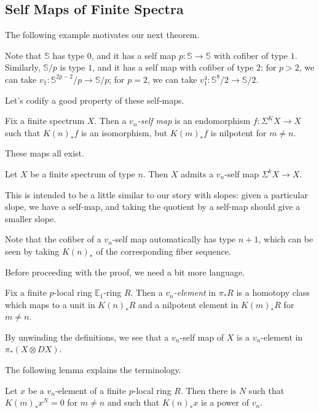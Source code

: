 \documentclass[../notes.tex]{subfiles}
\begin{document}
\subsection{Self Maps of Finite Spectra}
The following example motivates our next theorem.
\begin{example}
	Note that $\mathbb S$ has type $0$, and it has a self map $p\colon\mathbb S\to\mathbb S$ with cofiber of type $1$. Similarly, $\mathbb S/p$ is type $1$, and it has a self map with cofiber of type $2$: for $p>2$, we can take $v_1\colon\mathbb S^{2p-2}/p\to\mathbb S/p$; for $p=2$, we can take $v_1^4\colon\mathbb S^8/2\to\mathbb S/2$.
\end{example}
Let's codify a good property of these self-maps.
\begin{definition}
	Fix a finite spectrum $X$. Then a \textit{$v_n$-self map} is an endomorphism $f\colon\Sigma^KX\to X$ such that $K(n)_*f$ is an isomorphism, but $K(m)_*f$ is nilpotent for $m\ne n$.
\end{definition}
These maps all exist.
\begin{theorem} \label{thm:vn-maps-exist}
	Let $X$ be a finite spectrum of type $n$. Then $X$ admits a $v_n$-self map $\Sigma^kX\to X$.
\end{theorem}
\begin{remark}
	This is intended to be a little similar to our story with slopes: given a particular slope, we have a self-map, and taking the quotient by a self-map should give a smaller slope.
\end{remark}
\begin{remark}
	Note that the cofiber of a $v_n$-self map automatically has type $n+1$, which can be seen by taking $K(n)_*$ of the corresponding fiber sequence.
\end{remark}
Before proceeding with the proof, we need a bit more language.
\begin{definition}
	Fix a finite $p$-local ring $\mathbb E_1$-ring $R$. Then a \textit{$v_n$-element} in $\pi_*R$ is a homotopy class which maps to a unit in $K(n)_*R$ and a nilpotent element in $K(m)_*R$ for $m\ne n$.
\end{definition}
\begin{remark}
	By unwinding the definitions, we see that a $v_n$-self map of $X$ is a $v_n$-element in $\pi_*(X\otimes DX)$.
\end{remark}
The following lemma explains the terminology.
\begin{lemma} \label{lem:high-vn-power-behaves}
	Let $x$ be a $v_n$-element of a finite $p$-local ring $R$. Then there is $N$ such that $K(m)_*x^N=0$ for $m\ne n$ and such that $K(n)_*x$ is a power of $v_n$.
\end{lemma}
\end{document}
